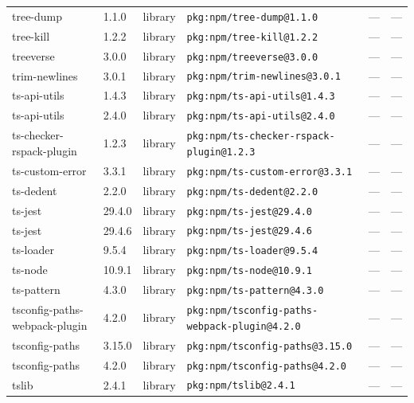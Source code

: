 \documentclass[11pt,a4paper]{article}
\begin{document}
\begin{longtable}{|p{4cm}|p{2cm}|p{1.6cm}|p{5cm}|p{1.5cm}|p{3.5cm}|}
\raggedright tree-dump & 1.1.0 & library & \small\texttt{pkg:npm/tree-dump@1.1.0} & — & \small — \\
\raggedright tree-kill & 1.2.2 & library & \small\texttt{pkg:npm/tree-kill@1.2.2} & — & \small — \\
\raggedright treeverse & 3.0.0 & library & \small\texttt{pkg:npm/treeverse@3.0.0} & — & \small — \\
\raggedright trim-newlines & 3.0.1 & library & \small\texttt{pkg:npm/trim-newlines@3.0.1} & — & \small — \\
\raggedright ts-api-utils & 1.4.3 & library & \small\texttt{pkg:npm/ts-api-utils@1.4.3} & — & \small — \\
\raggedright ts-api-utils & 2.4.0 & library & \small\texttt{pkg:npm/ts-api-utils@2.4.0} & — & \small — \\
\raggedright ts-checker-rspack-plugin & 1.2.3 & library & \small\texttt{pkg:npm/ts-checker-rspack-plugin@1.2.3} & — & \small — \\
\raggedright ts-custom-error & 3.3.1 & library & \small\texttt{pkg:npm/ts-custom-error@3.3.1} & — & \small — \\
\raggedright ts-dedent & 2.2.0 & library & \small\texttt{pkg:npm/ts-dedent@2.2.0} & — & \small — \\
\raggedright ts-jest & 29.4.0 & library & \small\texttt{pkg:npm/ts-jest@29.4.0} & — & \small — \\
\raggedright ts-jest & 29.4.6 & library & \small\texttt{pkg:npm/ts-jest@29.4.6} & — & \small — \\
\raggedright ts-loader & 9.5.4 & library & \small\texttt{pkg:npm/ts-loader@9.5.4} & — & \small — \\
\raggedright ts-node & 10.9.1 & library & \small\texttt{pkg:npm/ts-node@10.9.1} & — & \small — \\
\raggedright ts-pattern & 4.3.0 & library & \small\texttt{pkg:npm/ts-pattern@4.3.0} & — & \small — \\
\raggedright tsconfig-paths-webpack-plugin & 4.2.0 & library & \small\texttt{pkg:npm/tsconfig-paths-webpack-plugin@4.2.0} & — & \small — \\
\raggedright tsconfig-paths & 3.15.0 & library & \small\texttt{pkg:npm/tsconfig-paths@3.15.0} & — & \small — \\
\raggedright tsconfig-paths & 4.2.0 & library & \small\texttt{pkg:npm/tsconfig-paths@4.2.0} & — & \small — \\
\raggedright tslib & 2.4.1 & library & \small\texttt{pkg:npm/tslib@2.4.1} & — & \small — \\

\end{longtable}
\end{document}
